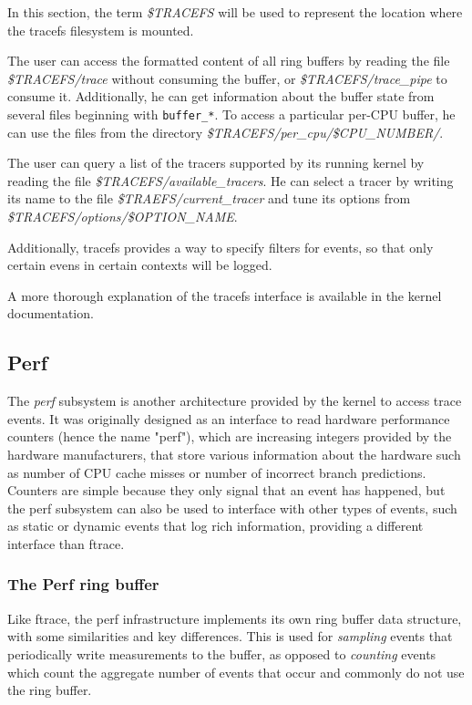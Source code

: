 In this section, the term \textit{\$TRACEFS} will be used to represent the
location where the tracefs filesystem is mounted.

The user can access the formatted content of all ring buffers by reading the
file \textit{\$TRACEFS/trace} without consuming the buffer, or
\textit{\$TRACEFS/trace\_pipe} to consume it. Additionally, he can get
information about the buffer state from several files beginning with
\verb|buffer_*|. To access a particular per-CPU buffer, he can use the files
from the directory \textit{\$TRACEFS/per\_cpu/\$CPU\_NUMBER/}.

The user can query a list of the tracers supported by its running kernel by
reading the file \textit{\$TRACEFS/available\_tracers}. He can select a
tracer by writing its name to the file \textit{\$TRAEFS/current\_tracer}
and tune its options from \textit{\$TRACEFS/options/\$OPTION\_NAME}.

Additionally, tracefs provides a way to specify filters for events, so that only
certain evens in certain contexts will be logged.

A more thorough explanation of the tracefs interface is available in the kernel
documentation.

\subsection{Perf}

The \textit{perf} subsystem is another architecture provided by the kernel to
access trace events. It was originally designed as an interface to read hardware
performance counters (hence the name "perf"), which are increasing integers
provided by the hardware manufacturers, that store various information about the
hardware such as number of CPU cache misses or number of incorrect branch
predictions. Counters are simple because they only signal that an event has
happened, but the perf subsystem can also be used to interface with other types
of events, such as static or dynamic events that log rich information, providing
a different interface than ftrace.

\subsubsection*{The Perf ring buffer}

Like ftrace, the perf infrastructure implements its own ring buffer data
structure, with some similarities and key differences. This is used for
\textit{sampling} events that periodically write measurements to the buffer, as
opposed to \textit{counting} events which count the aggregate number of events
that occur and commonly do not use the ring buffer.

